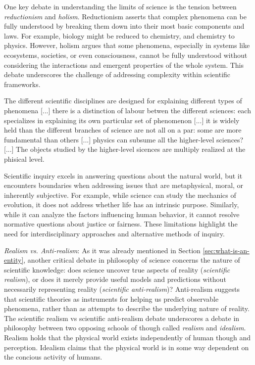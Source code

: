 One key debate in understanding the limits of science is the tension between \emph{reductionism} and \emph{holism}. Reductionism asserts that complex phenomena can be fully understood by breaking them down into their most basic components and laws. For example, biology might be reduced to chemistry, and chemistry to physics. However, holism argues that some phenomena, especially in systems like ecosystems, societies, or even consciousness, cannot be fully understood without considering the interactions and emergent properties of the whole system. This debate underscores the challenge of addressing complexity within scientific frameworks.

{\color{red} The different scientific disciplines are designed for explaining different types of phenomena [...] there is a distinction of labour betwen the different sciences: each specializes in explaining its own particular set of phenomenon [...] it is widely held than the different branches of science are not all on a par: some are more fundamental than others [...] physics can subsume all the higher-level sciences? [...] The objects studied by the higher-level sicences are multiply realized at the phisical level.}

Scientific inquiry excels in answering questions about the natural world, but it encounters boundaries when addressing issues that are metaphysical, moral, or inherently subjective. For example, while science can study the mechanics of evolution, it does not address whether life has an intrinsic purpose. Similarly, while it can analyze the factors influencing human behavior, it cannot resolve normative questions about justice or fairness. These limitations highlight the need for interdisciplinary approaches and alternative methods of inquiry.

\emph{Realism vs. Anti-realism}: As it was already mentioned in Section \ref{sec:what-is-an-entity}, another critical debate in philosophy of science concerns the nature of scientific knowledge: does science uncover true aspects of reality (\emph{scientific realism}), or does it merely provide useful models and predictions without necessarily representing reality (\emph{scientific anti-realism})? Anti-realism suggests that {\color{red}scientific theories as instruments for helping us predict observable phenomena, rather than as attempts to describe the underlying nature of reality}. The scientific realism vs scientific anti-realism debate underscores {\color{red} a debate in philosophy between two opposing schools of though called \emph{realism} and \emph{idealism}. Realism holds that the physical world exists independently of human though and perception. Idealism claims that the physical world is in some way dependent on the concious activity of humans.}

